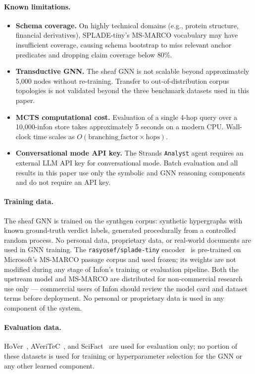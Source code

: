 \paragraph{Known limitations.}
\begin{itemize}
  \item \textbf{Schema coverage.}  On highly technical domains (e.g.,
    protein structure, financial derivatives), SPLADE-tiny's MS-MARCO
    vocabulary may have insufficient coverage, causing schema bootstrap
    to miss relevant anchor predicates and dropping claim coverage below
    80\%.
  \item \textbf{Transductive GNN.}  The sheaf GNN is not scalable beyond
    approximately 5,000 nodes without re-training.  Transfer to
    out-of-distribution corpus topologies is not validated beyond the three
    benchmark datasets used in this paper.
  \item \textbf{MCTS computational cost.}  Evaluation of a single 4-hop
    query over a 10,000-infon store takes approximately 5 seconds on a
    modern CPU.  Wall-clock time scales as
    $O(\text{branching\_factor} \times \text{hops})$.
  \item \textbf{Conversational mode API key.}  The Strands
    \texttt{Analyst} agent requires an external LLM API key for
    conversational mode.  Batch evaluation and all results in this paper
    use only the symbolic and GNN reasoning components and do not require
    an API key.
\end{itemize}

\paragraph{Training data.}
The sheaf GNN is trained on the synthgen corpus: synthetic hypergraphs
with known ground-truth verdict labels, generated procedurally from
a controlled random process.  No personal data, proprietary data, or
real-world documents are used in GNN training.
The \texttt{rasyosef/splade-tiny} encoder~\cite{alemneh2025spladetiny}
is pre-trained on Microsoft's MS-MARCO passage corpus and used frozen;
its weights are not modified during any stage of Infon's training or
evaluation pipeline.  Both the upstream model and MS-MARCO are
distributed for non-commercial research use only --- commercial users
of Infon should review the model card and dataset terms before
deployment.  No personal or proprietary data is used in any component
of the system.

\paragraph{Evaluation data.}
HoVer~\cite{jiang2020hover}, AVeriTeC~\cite{schlichtkrull2023averitec},
and SciFact~\cite{wadden2020scifact} are used for evaluation only; no
portion of these datasets is used for training or hyperparameter selection
for the GNN or any other learned component.
